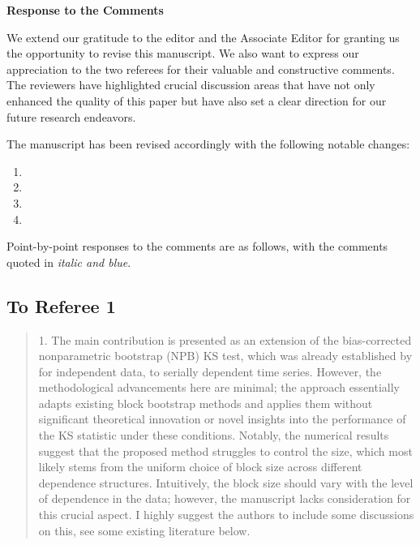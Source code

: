 \documentclass[12pt]{article}
\newenvironment{comment}%
{\begin{quotation}\noindent\small\it\color{darkblue}\ignorespaces%
}{\end{quotation}}
\begin{document}
\begin{center}
  {\Large\bf Response to the Comments}
\end{center}

We extend our gratitude to the editor and the Associate Editor for
granting us the opportunity to revise this manuscript. We also want to
express our appreciation to the two referees for their valuable and
constructive comments. The reviewers have highlighted crucial
discussion areas that have not only enhanced the quality of this paper
but have also set a clear direction for our future research
endeavors.


The manuscript has been
revised accordingly with the following notable changes:
\begin{enumerate}
\item 
\item 
\item 
\item 
\end{enumerate}


Point-by-point responses to the comments are as follows, with the
comments quoted in \emph{\color{darkblue} italic and blue}.

\subsection*{To Referee 1}

\begin{comment}
1. The main contribution is presented as an extension of the bias-corrected 
nonparametric
bootstrap (NPB) KS test, which was already established by 
\citet{babu2004goodness}
for independent data, to serially dependent time series. However, the 
methodological advancements
here are minimal; the approach essentially adapts existing block bootstrap 
methods and applies them without significant theoretical innovation or novel 
insights into the performance
of the KS statistic under these conditions. Notably, the numerical results 
suggest that the
proposed method struggles to control the size, which most likely stems from the 
uniform
choice of block size across different dependence structures. Intuitively, the 
block size should
vary with the level of dependence in the data; however, the manuscript lacks 
consideration
for this crucial aspect. I highly suggest the authors to include some 
discussions on this, see
some existing literature below.

\citep{hall1995blocking}

\citep{lahiri1999theoretical}

\citep{buhlmann2002bootstraps}

\citep{politis2004automatic}

\citep{lahiri2013resampling}

\end{comment}
\end{document}
